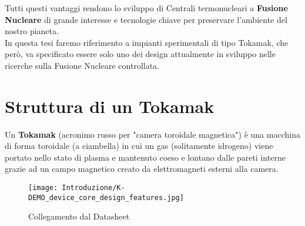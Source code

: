 \noindent
Tutti questi vantaggi rendono lo sviluppo di Centrali termonucleari a \textbf{Fusione Nucleare} di grande interesse e tecnologie chiave per preservare l'ambiente del nostro pianeta.\\
In questa tesi faremo riferimento a impianti sperimentali di tipo Tokamak, che però, va specificato essere solo uno dei design attualmente in sviluppo nelle ricerche sulla Fusione Nucleare controllata.
\newpage

\section*{Struttura di un Tokamak}
Un \textbf{Tokamak} (acronimo russo per "camera toroidale magnetica") è una macchina di forma toroidale (a ciambella) in cui un gas (solitamente idrogeno) viene portato nello stato di plasma e mantenuto coeso e lontano dalle pareti interne grazie ad un campo magnetico creato da elettromagneti esterni alla camera.
\begin{figure}[h]
	\centering
	\caption[ Schema di collegamento dal Datasheet]{Collegamento dal Datasheet}
	\texttt{[image: Introduzione/K-DEMO\_device\_core\_design\_features.jpg]}
\end{figure}

